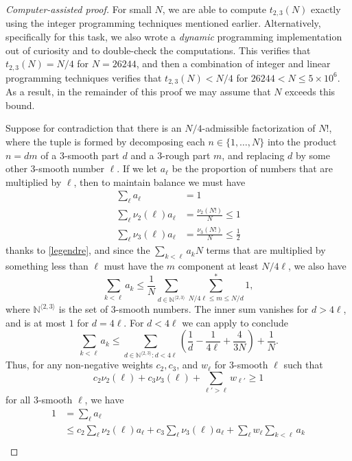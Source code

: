 \documentclass[12pt,a4paper,reqno]{amsart}
\numberwithin{equation}{section}
\theoremstyle{plain}
\theoremstyle{definition}
\newcommand\N{\mathbb{N}}
\begin{document}
\begin{proof}[Computer-assisted proof]
For small $N$, we are able to compute $t_{2,3}(N)$ exactly using the integer programming techniques mentioned earlier.
Alternatively, specifically for this task, we also wrote a \emph{dynamic} programming implementation out of curiosity and to double-check the computations.
This verifies that $t_{2,3}(N)=N/4$ for $N=26244$, and then a combination of integer and linear programming techniques verifies that $t_{2,3}(N) < N/4$ for $26244 < N \le 5\times 10^6$.
As a result, in the remainder of this proof we may assume that $N$ exceeds this bound.

Suppose for contradiction that there is an $N/4$-admissible factorization of $N!$, where the tuple is formed by decomposing each $n \in \{1,\dots,N\}$ into the product $n=dm$ of a $3$-smooth part $d$ and a $3$-rough part $m$, and replacing $d$ by some other $3$-smooth number $\ell$.  If we let $a_\ell$ be the proportion of numbers that are multiplied by $\ell$, then to maintain balance we must have
  \begin{align*}
    \sum_\ell a_\ell &= 1 \\
    \sum_\ell \nu_2(\ell) a_\ell &= \frac{\nu_2(N!)}{N} \leq 1 \\
    \sum_\ell \nu_3(\ell) a_\ell &= \frac{\nu_3(N!)}{N} \leq \frac{1}{2}
  \end{align*}
  thanks to \eqref{legendre}, and since the $\sum_{k < \ell} a_k N$ terms that are multiplied by something less than $\ell$ must have the $m$ component at least $N/4\ell$, we also have
  $$ \sum_{k < \ell} a_k \leq \frac{1}{N} \sum_{d \in \N^{\langle 2,3 \rangle}} \sum^*_{N/4\ell \leq m \leq N/d} 1,$$
  where $\N^{\langle 2,3 \rangle}$ is the set of $3$-smooth numbers.
  The inner sum vanishes for $d > 4\ell$, and is at most $1$ for $d = 4\ell$.  For $d < 4\ell$ we can apply  to conclude
  $$ \sum_{k < \ell} a_k \leq \sum_{d \in \N^{\langle 2,3 \rangle}: d < 4\ell} \left(\frac{1}{d}-\frac{1}{4\ell} + \frac{4}{3N}\right) + \frac{1}{N}.$$ 
  Thus, for any non-negative weights $c_2, c_3$, and $w_\ell$ for $3$-smooth $\ell$ such that
  \begin{equation}\label{ell-cond}
     c_2 \nu_2(\ell) + c_3 \nu_3(\ell) + \sum_{\ell' > \ell} w_{\ell'} \geq 1
  \end{equation}
  for all $3$-smooth $\ell$, we have
  \begin{align*}
    1 &= \sum_\ell a_\ell \\
    &\leq c_2 \sum_\ell \nu_2(\ell) a_\ell + c_3 \sum_\ell \nu_3(\ell) a_\ell + \sum_{\ell} w_\ell \sum_{k < \ell} a_k\\

\end{align*}
\end{proof}
\end{document}

